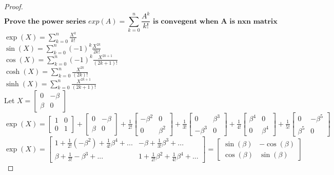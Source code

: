 \documentclass{book}
\begin{document}
\begin{proof}
\[ \textbf{Prove the power series } exp(A) = \sum_{k=0}^{n} \frac{A^{k}}{k!} \textbf{ is convegent when A is nxn matrix} \]
$\exp(X) = \sum_{k=0}^{n} \frac{X^{k}}{k!}$\\
$\sin(X) = \sum_{k=0}^{n} (-1)^{k}\frac{X^{2k}}{2k!}$\\
$\cos(X) = \sum_{k=0}^{n} (-1)^{k}\frac{X^{2k+1}}{(2k+1)!}$\\
$\cosh(X) = \sum_{k=0}^{n} \frac{X^{2k}}{(2k)!}$\\
$\sinh(X) = \sum_{k=0}^{n} \frac{X^{2k+1}}{(2k+1)!}$\\

Let $ X = 
    \begin{bmatrix}
    0 & -\beta \\
    \beta & 0 
    \end{bmatrix}
$\\

$
    \exp(X) = 
        \begin{bmatrix}
        1 & 0 \\
        0 & 1 
        \end{bmatrix}
        +
        \begin{bmatrix}
        0 & -\beta \\
        \beta & 0 
        \end{bmatrix}
        +
        \frac{1}{2!}
        \begin{bmatrix}
        -\beta^{2} & 0 \\
        0 & \beta^{2} 
        \end{bmatrix}
        +
        \frac{1}{3!}
        \begin{bmatrix}
        0 & \beta^{3} \\
        -\beta^{3} & 0 
        \end{bmatrix}
        +
        \frac{1}{4!}
        \begin{bmatrix}
        \beta^{4} & 0 \\
         0 & \beta^{4} 
        \end{bmatrix}
        +
        \frac{1}{5!}
        \begin{bmatrix}
        0 & -\beta^{5}\\
        \beta^{5} & 0 
        \end{bmatrix}
$\\
$
    \exp(X) = 
        \begin{bmatrix}
        1 + \frac{1}{2!}(-\beta^{2}) + \frac{1}{4!}\beta^{4} + ... & -\beta + \frac{1}{3!}\beta^{3} + ...\\
        \beta + \frac{1}{3!}-\beta^{3} + ... & 1 + \frac{1}{2!}\beta^{2} + \frac{1}{4!}\beta^{4} + ...
        \end{bmatrix}
        = 
        \begin{bmatrix}
        \sin(\beta) & -\cos(\beta)\\
        \cos(\beta) & \sin(\beta)
        \end{bmatrix}
$

\end{proof}
\end{document}
